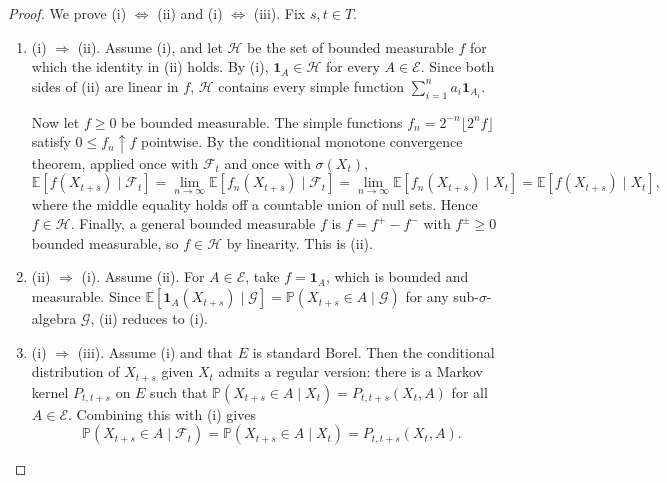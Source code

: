 	\begin{proof}
	  We prove (i) $\Leftrightarrow$ (ii) and (i) $\Leftrightarrow$ (iii). Fix $s, t \in T$.
		\begin{enumerate}
		  \item (i) $\Rightarrow$ (ii). Assume (i), and let $\mathcal{H}$ be the set of bounded measurable $f$ for which the identity in (ii) holds. By (i), $\mathbf{1}_A \in \mathcal{H}$ for every $A \in \mathcal{E}$. Since both sides of (ii) are linear in $f$, $\mathcal{H}$ contains every simple function $\sum_{i=1}^n a_i \mathbf{1}_{A_i}$.

			Now let $f \geq 0$ be bounded measurable. The simple functions $f_n = 2^{-n} \lfloor 2^n f \rfloor$ satisfy $0 \leq f_n \uparrow f$ pointwise. By the conditional monotone convergence theorem, applied once with $\mathcal{F}_t$ and once with $\sigma(X_t)$,
			\begin{equation}
				\mathbb{E}[f(X_{t+s}) \mid \mathcal{F}_t] = \lim_{n \to \infty} \mathbb{E}[f_n(X_{t+s}) \mid \mathcal{F}_t] = \lim_{n \to \infty} \mathbb{E}[f_n(X_{t+s}) \mid X_t] = \mathbb{E}[f(X_{t+s}) \mid X_t],
			\end{equation}
			where the middle equality holds off a countable union of null sets. Hence $f \in \mathcal{H}$. Finally, a general bounded measurable $f$ is $f = f^+ - f^-$ with $f^\pm \geq 0$ bounded measurable, so $f \in \mathcal{H}$ by linearity. This is (ii).
		  \item (ii) $\Rightarrow$ (i). Assume (ii). For $A \in \mathcal{E}$, take $f = \mathbf{1}_A$, which is bounded and measurable. Since $\mathbb{E}[\mathbf{1}_A(X_{t+s}) \mid \mathcal{G}] = \mathbb{P}(X_{t+s} \in A \mid \mathcal{G})$ for any sub-$\sigma$-algebra $\mathcal{G}$, (ii) reduces to (i).

			\item (i) $\Rightarrow$ (iii). Assume (i) and that $E$ is standard Borel. Then the conditional distribution of $X_{t+s}$ given $X_t$ admits a regular version: there is a Markov kernel $P_{t,t+s}$ on $E$ such that $\mathbb{P}(X_{t+s} \in A \mid X_t) = P_{t,t+s}(X_t, A)$ for all $A \in \mathcal{E}$. Combining this with (i) gives
				\begin{equation}
					\mathbb{P}(X_{t+s} \in A \mid \mathcal{F}_t) = \mathbb{P}(X_{t+s} \in A \mid X_t) = P_{t,t+s}(X_t, A).
				\end{equation}


\end{enumerate}
\end{proof}
